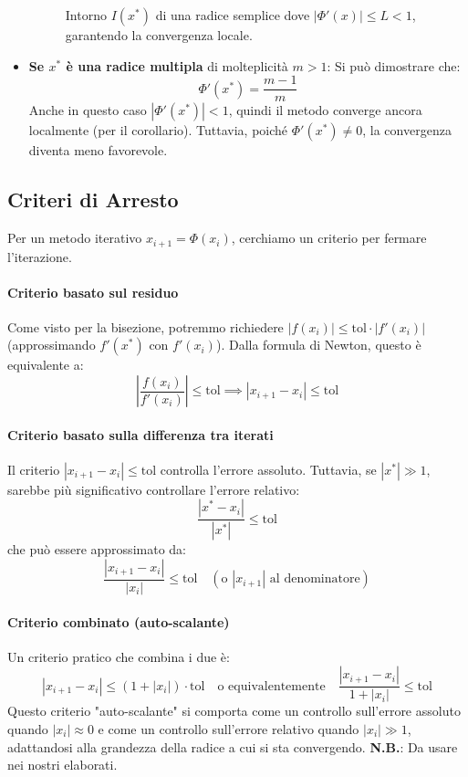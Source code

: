 \begin{itemize}
\begin{figure}[H]
    \caption{Intorno $I(x^*)$ di una radice semplice dove $|\Phi'(x)| \le L < 1$, garantendo la convergenza locale.}
    \label{fig:phi_derivata_newton}
    \end{figure}

    \item \textbf{Se $x^*$ è una radice multipla} di molteplicità $m > 1$: Si può dimostrare che:
    $$ \Phi'(x^*) = \frac{m-1}{m} $$
    Anche in questo caso $|\Phi'(x^*)| < 1$, quindi il metodo converge ancora localmente (per il corollario). Tuttavia, poiché $\Phi'(x^*) \neq 0$, la convergenza diventa meno favorevole.
\end{itemize}
\subsection{Criteri di Arresto}
Per un metodo iterativo $x_{i+1} = \Phi(x_i)$, cerchiamo un criterio per fermare l'iterazione.

\paragraph{Criterio basato sul residuo}
Come visto per la bisezione, potremmo richiedere $|f(x_i)| \le \text{tol} \cdot |f'(x_i)|$ (approssimando $f'(x^*)$ con $f'(x_i)$). Dalla formula di Newton, questo è equivalente a:
$$ \left| \frac{f(x_i)}{f'(x_i)} \right| \le \text{tol} \implies |x_{i+1} - x_i| \le \text{tol} $$

\paragraph{Criterio basato sulla differenza tra iterati}
Il criterio $|x_{i+1} - x_i| \le \text{tol}$ controlla l'errore assoluto. Tuttavia, se $|x^*| \gg 1$, sarebbe più significativo controllare l'errore relativo:
$$ \frac{|x^* - x_i|}{|x^*|} \le \text{tol} $$
che può essere approssimato da:
$$ \frac{|x_{i+1} - x_i|}{|x_i|} \le \text{tol} \quad (\text{o } |x_{i+1}| \text{ al denominatore}) $$

\paragraph{Criterio combinato (auto-scalante)}
Un criterio pratico che combina i due è:
$$ |x_{i+1} - x_i| \le (1 + |x_i|) \cdot \text{tol} \quad \text{o equivalentemente} \quad \frac{|x_{i+1} - x_i|}{1 + |x_i|} \le \text{tol} $$
Questo criterio "auto-scalante" si comporta come un controllo sull'errore assoluto quando $|x_i| \approx 0$ e come un controllo sull'errore relativo quando $|x_i| \gg 1$, adattandosi alla grandezza della radice a cui si sta convergendo. \textbf{N.B.}: Da usare nei nostri elaborati.

